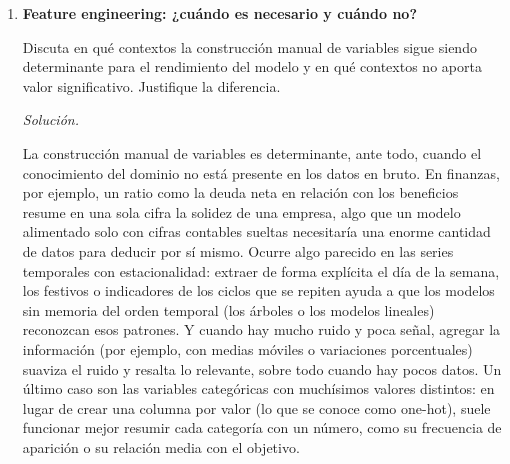 \documentclass[12pt]{article}
\newcommand\sol[1]{\begin{mdframed}
\emph{Solución.} #1
\end{mdframed}}
\begin{document}
\begin{enumerate}
{\begin{enumerate}[1.]
  \item Al elegir entre una regresión lineal y un GBM para un dataset pequeño. Cuando, con 500
  observaciones, se decide empezar por un modelo simple y solo aumentar la complejidad si
  hace falta, se está priorizando una varianza baja sobre un sesgo bajo. El modelo lineal tendrá sesgo
  alto si la relación es no lineal, pero con tan pocos datos la varianza de un GBM probablemente
  dominaría el error total.

  \item Al fijar el tamaño de la ventana de entrenamiento en series temporales. Una ventana corta
  produce estimaciones más adaptadas al régimen actual (bajo sesgo temporal) pero más ruidosas (alta
  varianza), mientras que una ventana larga es más estable pero puede incorporar regímenes obsoletos.
  Esta decisión es en sí gestión del tradeoff sesgo-varianza en el tiempo.
\end{enumerate}
}

\item \textbf{Feature engineering: ¿cuándo es necesario y cuándo no?}

Discuta en qué contextos la construcción manual de variables sigue siendo determinante para el
rendimiento del modelo y en qué contextos no aporta valor significativo. Justifique la diferencia.

\sol{

La construcción manual de variables es determinante, ante todo, cuando el conocimiento del dominio no
está presente en los datos en bruto. En finanzas, por ejemplo, un ratio como la deuda neta en
relación con los beneficios resume en una sola cifra la solidez de una empresa, algo que un modelo
alimentado solo con cifras contables sueltas necesitaría una enorme cantidad de datos para deducir por
sí mismo. Ocurre algo parecido en las series temporales con estacionalidad: extraer de forma explícita
el día de la semana, los festivos o indicadores de los ciclos que se repiten ayuda a que los modelos
sin memoria del orden temporal (los árboles o los modelos lineales) reconozcan esos patrones. Y cuando
hay mucho ruido y poca señal, agregar la información (por ejemplo, con medias móviles o variaciones
porcentuales) suaviza el ruido y resalta lo relevante, sobre todo cuando hay pocos datos. Un último
caso son las variables categóricas con muchísimos valores distintos: en lugar de crear una columna por
valor (lo que se conoce como one-hot), suele funcionar mejor resumir cada categoría con un número, como
su frecuencia de aparición o su relación media con el objetivo.

}
\end{enumerate}
\end{document}
